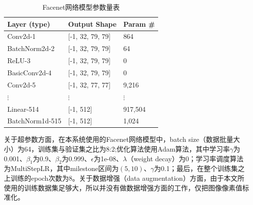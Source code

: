 \begin{table}[H]
    \centering
    \caption{Facenet网络模型参数量表}
    \label{tab:modelparams}
    \begin{tabularx}{.95\textwidth}{X<{\centering}X<{\centering}X<{\centering}}
        \toprule
        Layer (type)          & Output Shape     & Param \# \\
        \midrule
        Conv2d-1              & [-1, 32, 79, 79] & 864      \\
        BatchNorm2d-2         & [-1, 32, 79, 79] & 64       \\
        ReLU-3                & [-1, 32, 79, 79] & 0        \\
        BasicConv2d-4         & [-1, 32, 79, 79] & 0        \\
        Conv2d-5              & [-1, 32, 77, 77] & 9,216    \\
        $\vdots$              & $\vdots$         & $\vdots$ \\
        Linear-514            & [-1, 512]        & 917,504  \\
        BatchNorm1d-515       & [-1, 512]        & 1,024    \\
        \bottomrule
    \end{tabularx}
\end{table}

关于超参数方面，在本系统使用的Facenet网络模型中，batch size（数据批量大小）为64，训练集与验证集之比为8:2;优化算法使用Adam算法，其中学习率$\gamma$为0.001、$\beta_{1}$为0.9、$\beta_{2}$为0.999、$\epsilon$为1e-08、$\lambda$（weight decay）为0；学习率调度算法为MultiStepLR，其中milestone区间为$(5,10)$、$\gamma$为0.1；最后，在整个训练集之上训练的epoch次数为8。关于数据增强（data augmentation）方面，由于本文所使用的训练数据集足够大，所以并没有做数据增强方面的工作，仅把图像像素值标准化。

